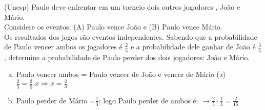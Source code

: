 \begin{ex}
(Unesp) Paulo deve enfrentar em um torneio dois outros jogadores , João e Mário.\\ Considere os eventos:	(A) Paulo vence João e (B) Paulo vence Mário. \\
Os resultados dos jogos são eventos independentes. Sabendo que a probabilidade de Paulo vencer ambos os jogadores é $\frac{2}{5}$ e a probabilidade dele ganhar de João é  $\frac{3}{5}$, determine a probabilidade de Paulo perder dos dois jogadores: João e Mário.
  \begin{sol}
    \phantom{A} 
      \begin{enumerate} [(a)]
          \item Paulo vencer ambos = Paulo vencer de João e vencer de Mário (\textit{x}) \\
          $\frac{2}{5}=\frac{3}{5}.x \Longrightarrow x=\frac{2}{3}$
           \item Paulo perder de Mário =$\frac{1}{3}$; logo Paulo perder de ambos é: $\longrightarrow\frac{2}{5}\cdot\frac{1}{3}=\frac{2}{15}$
           
      \end{enumerate}
  \end{sol}
\end{ex}